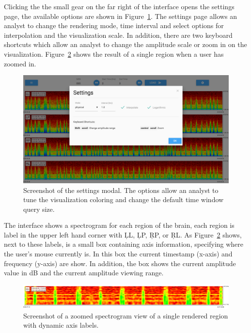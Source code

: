 Clicking the the small gear on the far right of the interface opens the
settings page, the available options are shown in Figure~\ref{fig:settings}.
The settings page allows an analyst to change the rendering mode, time interval
and select options for interpolation and the visualization scale. In addition,
there are two keyboard shortcuts which allow an analyst to change the amplitude
scale or zoom in on the visualization. Figure~\ref{fig:zoomed-region} shows the
result of a single region when a user has zoomed in. \\

\begin{figure}[h]
\begin{center}
\includegraphics[scale=0.35]{./img/settings.png}
\caption{Screenshot of the settings modal. The options allow an analyst to tune
  the visualization coloring and change the default time window query size.}
\label{fig:settings}
\end{center}
\end{figure}

The interface shows a spectrogram for each region of the brain, each region is
label in the upper left hand corner with \c{LL}, \c{LP}, \c{RP}, or \c{RL}.  As
Figure~\ref{fig:zoomed-region} shows, next to these labels, is a small box
containing axis information, specifying where the user's mouse currently is. In
this box the current timestamp (x-axis) and frequency (y-axis) are show. In
addition, the box shows the current amplitude value in dB and the current
amplitude viewing range. \\

\begin{figure}[h]
\begin{center}
\includegraphics[scale=0.35]{./img/zoomed-region.png}
\caption{Screenshot of a zoomed spectrogram view of a single rendered region
  with dynamic axis labels.}
\label{fig:zoomed-region}
\end{center}
\end{figure}

